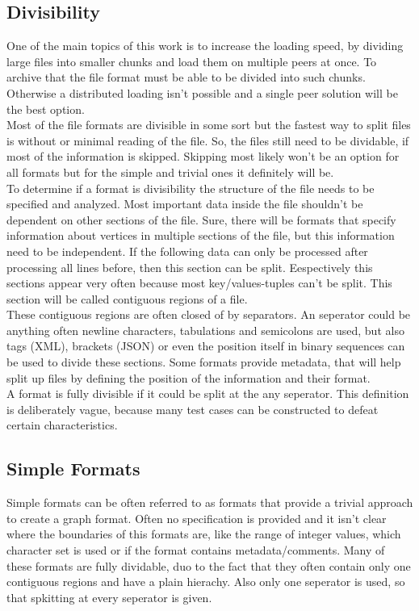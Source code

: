 \subsection{Divisibility}
One of the main topics of this work is to increase the loading speed, by dividing large files into smaller chunks and load them on multiple peers at once. To archive that the file format must be able to be divided into such chunks. Otherwise a distributed loading isn’t possible and a single peer solution will be the best option.\\
Most of the file formats are divisible in some sort but the fastest way to split files is without or minimal reading of the file. So, the files still need to be dividable, if most of the information is skipped. Skipping most likely won’t be an option for all formats but for the simple and trivial ones it definitely will be.\\
To determine if a format is divisibility the structure of the file needs to be specified and analyzed. Most important data inside the file shouldn’t be dependent on other sections of the file. Sure, there will be formats that specify information about vertices in multiple sections of the file, but this information need to be independent. If the following data can only be processed after processing all lines before, then this section can be split. Eespectively this sections appear very often because most  key/values-tuples can’t be split. This section will be called contiguous regions of a file.\\
These contiguous regions are often closed of by separators. An seperator could be anything often newline characters, tabulations and  semicolons are used, but also tags (XML), brackets (JSON) or even the position itself in binary sequences can be used to divide these sections. Some formats provide metadata, that will help split up files by defining the position of the information and their format.\\
A format is fully divisible if it could be split at the any seperator. This definition is deliberately vague, because many test cases can be constructed to defeat certain characteristics.

\subsection{Simple Formats}
Simple formats can be often referred to as formats that provide a trivial approach to create a graph format. Often no specification is provided and it isn’t clear where the boundaries of this formats are, like the range of integer values, which character set is used or if the format contains metadata/comments. Many of these formats are fully dividable, duo to the fact that they often contain only one contiguous regions and have a plain hierachy. Also only one seperator is used, so that spkitting at every seperator is given.\cite{Roughan.10.03.2015}
\newpage
